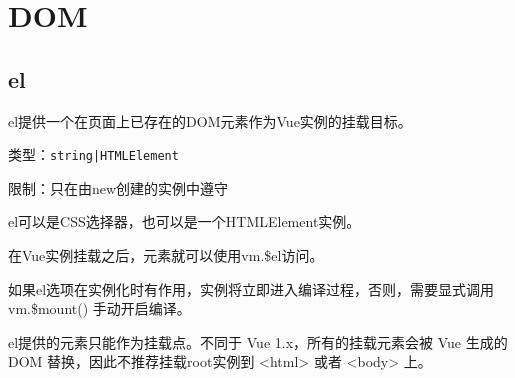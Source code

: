 \begin{lstlisting}[language=JavaScript]

\end{lstlisting}




\begin{lstlisting}[language=JavaScript]

\end{lstlisting}




\begin{lstlisting}[language=JavaScript]

\end{lstlisting}




\begin{lstlisting}[language=JavaScript]

\end{lstlisting}




\begin{lstlisting}[language=JavaScript]

\end{lstlisting}




\chapter{DOM}




\section{el}

el提供一个在页面上已存在的DOM元素作为Vue实例的挂载目标。


\begin{compactitem}
\item 类型：\texttt{string|HTMLElement}
\item 限制：只在由new创建的实例中遵守
\end{compactitem}


el可以是CSS选择器，也可以是一个HTMLElement实例。

在Vue实例挂载之后，元素就可以使用vm.\$el访问。

\begin{compactitem}
\item 如果el选项在实例化时有作用，实例将立即进入编译过程，否则，需要显式调用 vm.\$mount() 手动开启编译。
\item el提供的元素只能作为挂载点。不同于 Vue 1.x，所有的挂载元素会被 Vue 生成的 DOM 替换，因此不推荐挂载root实例到 <html> 或者 <body> 上。
\end{compactitem}



